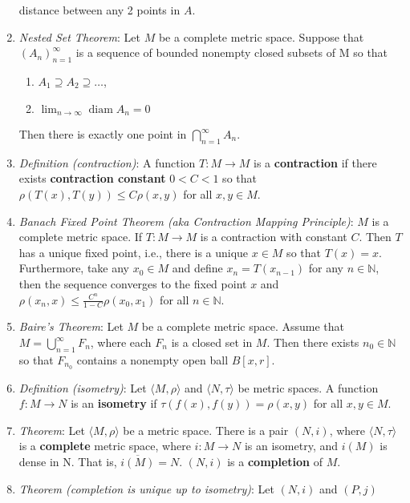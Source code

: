 \documentclass[10pt]{article}
\DeclareMathOperator{\diam}{diam}
\begin{document}
\begin{multicols*}{3}
\begin{enumerate}
		      distance between any 2 points in \(A\).
		\item \emph{Nested Set Theorem}: Let \(M\) be a complete metric space. Suppose that
		      \((A_n)^\infty_{n=1}\) is a sequence of bounded nonempty closed subsets of M
		      so that
		      \begin{enumerate}
			      \item \(A_1 \supseteq A_2 \supseteq \dots\),
			      \item \(\lim_{n\to\infty} \diam A_n = 0\)
		      \end{enumerate}
		      Then there is exactly one point in \(\bigcap^\infty_{n=1}A_n\).
		\item \emph{Definition (contraction)}: A function \(T:M\to M\) is a
		      \textbf{contraction} if there exists \textbf{contraction constant} \(0<C<1\) so that
		      \(\rho(T(x),T(y))\leq C\rho(x,y)\) for all \(x,y\in M\).
		\item \emph{Banach Fixed Point Theorem (aka Contraction Mapping Principle)}: \(M\) is a
		      complete metric space. If \(T:M\to M\) is a contraction with
		      constant \(C\). Then \(T\) has a unique fixed point, i.e., there is a unique
		      \(x\in M\) so that \(T(x)=x\). Furthermore, take any \(x_0 \in M\) and define
		      \(x_n = T(x_{n-1})\) for any \(n\in\mathbb{N}\), then the sequence converges
		      to the fixed point \(x\) and \(\rho(x_n,x)\leq\frac{C^n}{1-C}\rho(x_0,x_1)\)
		      for all \(n\in\mathbb{N}\).
		\item \emph{Baire's Theorem}: Let \(M\) be a complete metric space. Assume that
		      \(M=\bigcup^\infty_{n=1} F_n\), where each \(F_n\) is a closed set in \(M\).
		      Then there exists \(n_0 \in \mathbb{N}\) so that \(F_{n_0}\) contains a nonempty
		      open ball \(B[x,r]\).
		\item \emph{Definition (isometry)}: Let \(\langle M,\rho\rangle\) and \(\langle N,\tau\rangle\)
		      be metric spaces. A function \(f:M\to N\) is an \textbf{isometry} if
		      \(\tau(f(x),f(y)) = \rho(x,y)\) for all \(x,y\in M\).
		\item \emph{Theorem}: Let \(\langle M,\rho\rangle\) be a metric space. There is a pair
		      \((N,i)\), where \(\langle N,\tau\rangle\) is a \textbf{complete} metric space,
		      where \(i:M\to N\) is an isometry, and \(i(M)\) is dense in N. That
		      is, \(\overline{i(M)} = N\). \((N,i)\) is a \textbf{completion} of \(M\).
		\item \emph{Theorem (completion is unique up to isometry)}: Let \((N,i)\) and \((P,j)\)

\end{enumerate}
\end{multicols*}
\end{document}
